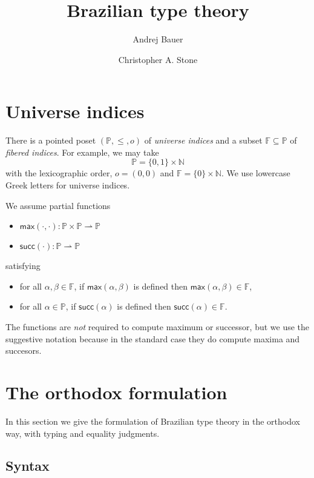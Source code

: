 \documentclass{article}
\newcommand{\NN}{\mathbb{N}} %
\newcommand{\PP}{\mathbb{P}} %
\newcommand{\FF}{\mathbb{F}} %
\newcommand{\zero}{o} %
\newcommand{\piClose}[2]{\mathsf{max}(#1,#2)}   %
\newcommand{\uClose}[1]{\mathsf{succ}(#1)}  %
\begin{document}
\title{Brazilian type theory}
\author{Andrej Bauer \and Christopher A. Stone}
\maketitle

\section{Universe indices}
\label{sec:universe-indices}

There is a pointed poset $(\PP, {\leq}, \zero)$ of \emph{universe
  indices} and a subset $\FF \subseteq \PP$ of \emph{fibered indices}.
For example, we may take
%
\begin{equation*}
  \PP = \{0,1\} \times \NN
\end{equation*}
%
with the lexicographic order, $\zero = (0,0)$ and $\FF = \{0\} \times
\NN$. We use lowercase Greek letters for universe indices.

We assume partial functions
\begin{itemize}
  \item $\piClose{\cdot}{\cdot} : \PP \times \PP \rightharpoonup \PP$
  \item $\uClose{\cdot}  : \PP \rightharpoonup \PP$
\end{itemize}
%
satisfying
%
\begin{itemize}
\item for all $\alpha, \beta \in \FF$, if $\piClose{\alpha}{\beta}$ is defined then
  $\piClose{\alpha}{\beta} \in \FF$,
\item for all $\alpha \in \PP$, if $\uClose{\alpha}$ is defined then $\uClose{\alpha} \in
  \FF$.
\end{itemize}
%
The functions are \emph{not} required to compute maximum or successor, but we use the
suggestive notation because in the standard case they do compute maxima and succesors.

\section{The orthodox formulation}
\label{sec:orthodox-formulation}

In this section we give the formulation of Brazilian type theory in the orthodox way, with
typing and equality judgments.

\subsection{Syntax}
\label{sec:syntax}
\end{document}
